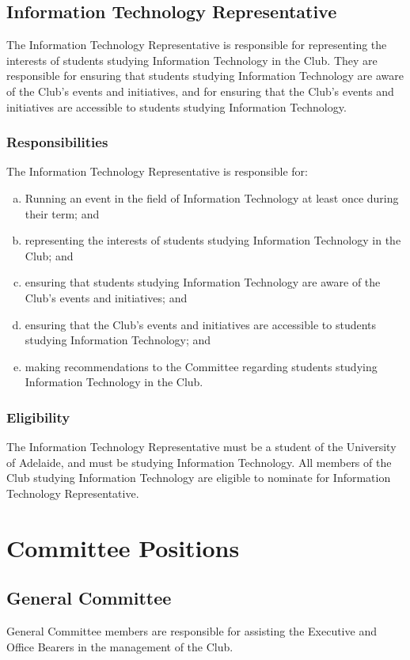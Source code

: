 \documentclass[11pt]{report}
\begin{document}
\section{Information Technology Representative}
The Information Technology Representative is responsible for representing the interests of students studying Information Technology in the Club. They are responsible for ensuring that students studying Information Technology are aware of the Club's events and initiatives, and for ensuring that the Club's events and initiatives are accessible to students studying Information Technology.
\subsection{Responsibilities}
The Information Technology Representative is responsible for:
\begin{enumerate}[(a)]
    \item Running an event in the field of Information Technology at least once during their term; and
    \item representing the interests of students studying Information Technology in the Club; and
    \item ensuring that students studying Information Technology are aware of the Club's events and initiatives; and
    \item ensuring that the Club's events and initiatives are accessible to students studying Information Technology; and
    \item making recommendations to the Committee regarding students studying Information Technology in the Club.
\end{enumerate}
\subsection{Eligibility}
The Information Technology Representative must be a student of the University of Adelaide, and must be studying Information Technology. All members of the Club studying Information Technology are eligible to nominate for Information Technology Representative.

\chapter{Committee Positions}
\section{General Committee}
General Committee members are responsible for assisting the Executive and Office Bearers in the management of the Club. 
\end{document}
